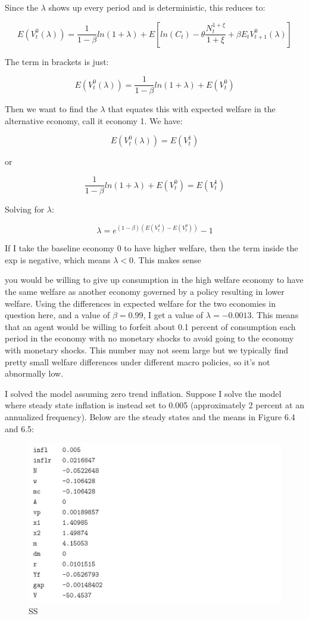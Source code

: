 \documentclass[10pt,math=newtx,citestyle=gb7714-2015,bibstyle=gb7714-2015]{elegantbook}
\begin{document}
{	Since the $\lambda$ shows up every period and is deterministic, this reduces to:
	
	$$E(V_t^0(\lambda))=\frac{1}{1-\beta}ln(1+\lambda)+E\left[ln(C_t)-\theta\frac{N_t^{1+\xi}}{1+\xi}+\beta E_tV_{t+1}^0(\lambda)\right]$$
	
	The term in brackets is just:
	
	$$E(V_t^0(\lambda))=\frac{1}{1-\beta}ln(1+\lambda)+E(V_t^0)$$
	
	Then we want to find the $\lambda$  that equates this with expected welfare in the alternative economy, call it economy 1. We have:
	
	$$E(V_t^0(\lambda))=E(V_t^1)$$
	
	or
	
	$$\frac{1}{1-\beta}ln(1+\lambda)+E(V_t^0)=E(V_t^1)$$
	
	Solving for $\lambda$:
	
	$$\lambda=e^{(1-\beta)(E(V_t^1)-E(V_t^0))}-1$$
	
	If I take the baseline economy 0 to have higher welfare, then the term inside the exp is negative, which means $\lambda< 0$. This makes sense { you would be willing to give up consumption in the high welfare economy to have the same welfare as another economy governed by a policy resulting in lower welfare. Using the differences in expected welfare for the two economies in question here, and a value of $\beta = 0.99$, I get a value of $\lambda = -0.0013$. This means that an agent would be willing
		to forfeit about 0.1 percent of consumption each period in the economy with no monetary shocks to avoid going to the economy with monetary shocks. This number may not seem large but we
		typically find pretty small welfare differences under different macro policies, so it's not abnormally low.
		
		I solved the model assuming zero trend inflation. Suppose I solve the model where steady state inflation is instead set to 0.005 (approximately 2 percent at an annualized frequency). Below are the steady states and the means in Figure 6.4 and 6.5:
		
		\begin{figure}[htbp!]
			\centering
			\includegraphics[width=0.8\linewidth]{FIG/SS1}
			\caption{SS}\label{6.4}
			\centering
		\end{figure}
		
}}
\end{document}
